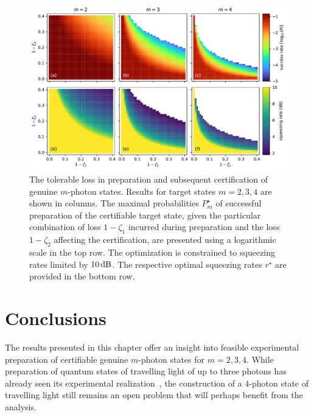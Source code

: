 \documentclass{article}
\begin{document}
\begin{figure}[h]
  \begin{center}
    \includegraphics[width = \columnwidth]{import/hierarchy_2-3-4_1000.pdf}
  \end{center}
  \caption{
    The tolerable loss in preparation and subsequent certification of genuine $m$-photon states. Results for target states $m = 2, 3, 4$ are shown in columns. The maximal probabilities $P_{m}^{\star}$ of successful preparation of the certifiable target state, given the particular combination of loss $1 - \zeta_{1}$ incurred during preparation and the loss $1 - \zeta_{2}$ affecting the certification, are presented using a logarithmic scale in the top row. The optimization is constrained to squeezing rates limited by $10\,\mathrm{dB}$. The respective optimal squeezing rates $r^{\star}$ are provided in the bottom row.
  }
  \label{f-otm-234}
\end{figure}

%
%

\FloatBarrier
\section{Conclusions}

The results presented in this chapter offer an insight into feasible experimental preparation of certifiable genuine $m$-photon states for $m = 2, 3, 4$. While preparation of quantum states of travelling light of up to three photons has already seen its experimental realization~\cite{yukawa2013a}, the construction of a $4$-photon state of travelling light still remains an open problem that will perhaps benefit from the analysis.

%
% 

\FloatBarrier
\printbibliography[heading = bibnumbered]
\end{document}

